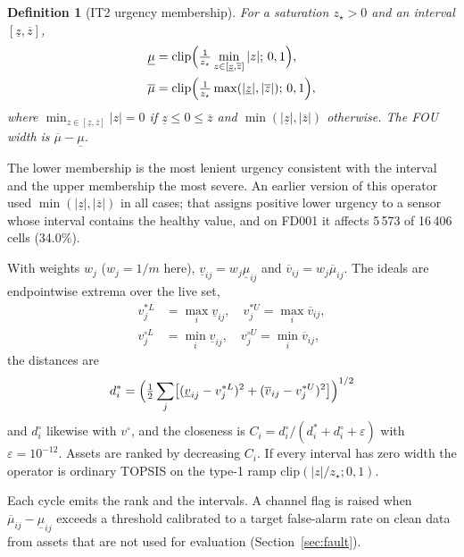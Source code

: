 \documentclass[journal,10pt,twocolumn]{IEEEtran}
\newtheorem{definition}{Definition}
\begin{document}
\begin{definition}[IT2 urgency membership]
For a saturation $z_\star>0$ and an interval $[\underline z,\overline z]$,
\begin{align}
\underline{\mu}&=\mathrm{clip}\Bigl(\tfrac{1}{z_\star}\min_{z\in[\underline z,\overline z]}|z|;\,0,1\Bigr),\\
\overline{\mu}&=\mathrm{clip}\Bigl(\tfrac{1}{z_\star}\max(|\underline z|,|\overline z|);\,0,1\Bigr),
\end{align}
where $\min_{z\in[\underline z,\overline z]}|z|=0$ if $\underline z\le 0\le\overline z$ and $\min(|\underline z|,|\overline z|)$ otherwise. The FOU width is $\overline\mu-\underline\mu$.
\end{definition}
The lower membership is the most lenient urgency consistent with the interval and the upper membership the most severe. An earlier version of this operator used $\min(|\underline z|,|\overline z|)$ in all cases; that assigns positive lower urgency to a sensor whose interval contains the healthy value, and on FD001 it affects 5\,573 of 16\,406 cells (34.0\%).

With weights $w_j$ ($w_j=1/m$ here), $\underline v_{ij}=w_j\underline\mu_{ij}$ and $\overline v_{ij}=w_j\overline\mu_{ij}$. The ideals are endpointwise extrema over the live set,
\begin{align}
v_j^{\ast L}&=\max_i\underline v_{ij},\quad v_j^{\ast U}=\max_i\overline v_{ij},\label{eq:ideals}\\
v_j^{\circ L}&=\min_i\underline v_{ij},\quad v_j^{\circ U}=\min_i\overline v_{ij},\nonumber
\end{align}
the distances are
\begin{equation}
d_i^{\ast}=\Bigl(\tfrac12\sum_{j}\bigl[(\underline v_{ij}-v_j^{\ast L})^2+(\overline v_{ij}-v_j^{\ast U})^2\bigr]\Bigr)^{1/2}
\label{eq:dplus}
\end{equation}
and $d_i^{\circ}$ likewise with $v^{\circ}$, and the closeness is $C_i=d_i^{\circ}/(d_i^{\ast}+d_i^{\circ}+\varepsilon)$ with $\varepsilon=10^{-12}$. Assets are ranked by decreasing $C_i$. If every interval has zero width the operator is ordinary TOPSIS on the type-1 ramp $\mathrm{clip}(|z|/z_\star;0,1)$.

Each cycle emits the rank and the intervals. A channel flag is raised when $\overline\mu_{ij}-\underline\mu_{ij}$ exceeds a threshold calibrated to a target false-alarm rate on clean data from assets that are not used for evaluation (Section~\ref{sec:fault}).
\end{document}
